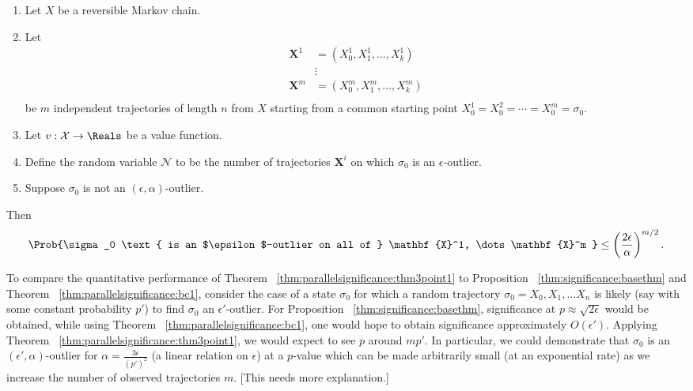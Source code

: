\documentclass[12pt]{article}
\begin{document}
\begin{corollary}
    \label{cor:parallelsignificance:cor32}
    \begin{enumerate}
        \item
            Let \( X \) be a reversible Markov chain.
        \item
            Let
            \begin{align*}
                \mathbf{X}^1 &= (X_0^1, X_1^1, \dots, X_k^1 )\\
                &\vdots \\
                \mathbf{X}^m &= (X_0^m, X_1^m, \dots, X_k^m )\\
            \end{align*}
            be \( m \) independent trajectories of length \( n \) from \(
            X \) starting from a common starting point \( X_0^1 = X_0^2
            = \cdots = X_0^m = \sigma_0 \).
        \item
            Let \( v :  \mathcal{X} \to \Reals \) be a value function.
        \item
            Define the random variable \( \mathcal{N} \) to be the
            number of trajectories \( \mathbf{X}^i \) on which \( \sigma_0
            \) is an \( \epsilon \)-outlier.
        \item
            Suppose \( \sigma_0 \) is not an \( (\epsilon, \alpha) \)-outlier.
    \end{enumerate}
    Then
    \[
        \Prob{\sigma_0 \text{ is an $\epsilon$-outlier on all of } \mathbf
        {X}^1, \dots \mathbf{X}^m } \le \left( \frac{2\epsilon}{\alpha}
        \right)^{m/2}.
    \]
\end{corollary}

\begin{example}
    To compare the quantitative performance of Theorem~%
    \ref{thm:parallelsignificance:thm3point1} to Proposition~%
    \ref{thm:significance:basethm} and Theorem~%
    \ref{thm:parallelsignificance:bc1}, consider the case of a state \( \sigma_0
    \) for which a random trajectory \( \sigma_0 = X_0 , X_1 , \dots X_n
    \) is likely (say with some constant probability \( p' \)) to find \(
    \sigma_0 \) an \( \epsilon' \)-outlier.  For Proposition~%
    \ref{thm:significance:basethm}, significance at \( p \approx \sqrt{2\epsilon}
    \) would be obtained, while using Theorem~%
    \ref{thm:parallelsignificance:bc1}, one would hope to obtain significance
    approximately \( O(\epsilon') \).  Applying Theorem~%
    \ref{thm:parallelsignificance:thm3point1}, we would expect to see \( p \)
    around \( m p' \).  In particular, we could demonstrate that \(
    \sigma_0 \) is an \( (\epsilon', \alpha) \)-outlier for \( \alpha =
    \frac{3\epsilon} {(p')^2} \) (a linear relation on \( \epsilon \))
    at a \( p \)-value which can be made arbitrarily small (at an
    exponential rate) as we increase the number of observed trajectories
    \( m \).  [This needs more explanation.]
\end{example}
\end{document}

